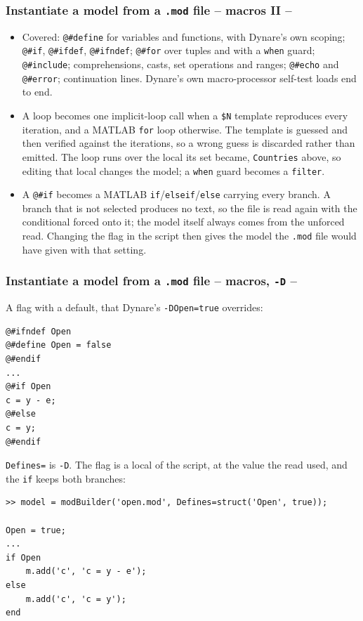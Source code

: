 \documentclass[10pt,slidestop]{beamer}
\theoremstyle{plain}
\begin{document}
\begin{frame}[fragile]
  \frametitle{Instantiate a model from a \texttt{.mod} file -- macros II --}

  \begin{itemize}
  \item Covered: \texttt{@\#define} for variables and functions, with Dynare's own
    scoping; \texttt{@\#if}, \texttt{@\#ifdef}, \texttt{@\#ifndef};
    \texttt{@\#for} over tuples and with a \texttt{when} guard; \texttt{@\#include};
    comprehensions, casts, set operations and ranges; \texttt{@\#echo} and
    \texttt{@\#error}; continuation lines. Dynare's own macro-processor self-test
    loads end to end.
  \item A loop becomes one implicit-loop call when a \texttt{\$N} template reproduces
    every iteration, and a MATLAB \texttt{for} loop otherwise. The template is guessed
    and then verified against the iterations, so a wrong guess is discarded rather than
    emitted. The loop runs over the local its set became, \texttt{Countries} above, so
    editing that local changes the model; a \texttt{when} guard becomes a
    \texttt{filter}.
  \item A \texttt{@\#if} becomes a MATLAB \texttt{if}/\texttt{elseif}/\texttt{else}
    carrying every branch. A branch that is not selected produces no text, so the file is
    read again with the conditional forced onto it; the model itself always comes from
    the unforced read. Changing the flag in the script then gives the model the
    \texttt{.mod} file would have given with that setting.
  \end{itemize}

\end{frame}


\begin{frame}[fragile]
  \frametitle{Instantiate a model from a \texttt{.mod} file -- macros, \texttt{-D} --}

  A flag with a default, that Dynare's \texttt{-DOpen=true} overrides:

  \begin{lstlisting}[language=Dynare,basicstyle=\scriptsize\ttfamily]
@#ifndef Open
@#define Open = false
@#endif
...
@#if Open
c = y - e;
@#else
c = y;
@#endif
  \end{lstlisting}

  \texttt{Defines=} is \texttt{-D}. The flag is a local of the script, at the value the
  read used, and the \texttt{if} keeps both branches:

  \begin{lstlisting}[style=MatlabConsole,basicstyle=\ttfamily\scriptsize]
>> model = modBuilder('open.mod', Defines=struct('Open', true));

Open = true;
...
if Open
    m.add('c', 'c = y - e');
else
    m.add('c', 'c = y');
end
  \end{lstlisting}

\end{frame}
\end{document}
